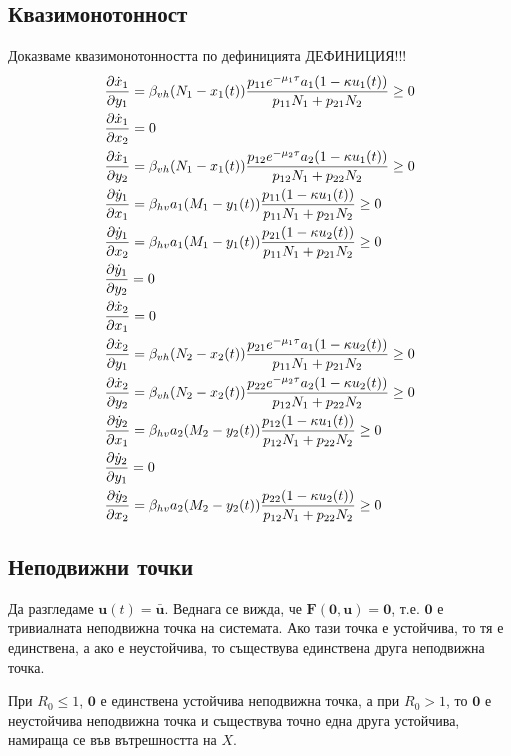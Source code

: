 \subsection{Квазимонотонност}
Доказваме квазимонотонността по дефиницията \color{Red} ДЕФИНИЦИЯ!!!
\color{Black}
\begin{align*}
  &\pdv{\dot{x}_1}{y_1} = \beta_{vh} (N_1-x_1(t)) \frac{p_{11} e^{-\mu_1 \tau} a_1 (1-\kappa u_1(t))}{p_{11} N_1 + p_{21} N_2} \geq 0 \\
  &\pdv{\dot{x}_1}{x_2} = 0 \\
  &\pdv{\dot{x}_1}{y_2} = \beta_{vh} (N_1-x_1(t))\frac{p_{12} e^{-\mu_2 \tau} a_2 (1-\kappa u_1(t))}{p_{12} N_1 + p_{22} N_2} \geq 0 \\
  &\pdv{\dot{y}_1}{x_1} = \beta_{hv} a_1 (M_1-y_1(t)) \frac{p_{11} (1-\kappa u_1(t))}{p_{11} N_1 + p_{21} N_2} \geq 0 \\
  &\pdv{\dot{y}_1}{x_2} = \beta_{hv} a_1 (M_1-y_1(t)) \frac{p_{21} (1-\kappa u_2(t))}{p_{11} N_1 + p_{21} N_2} \geq 0 \\
  &\pdv{\dot{y}_1}{y_2} = 0 \\
  &\pdv{\dot{x}_2}{x_1} = 0 \\
  &\pdv{\dot{x}_2}{y_1} = \beta_{vh} (N_2-x_2(t)) \frac{p_{21} e^{-\mu_1 \tau} a_1 (1-\kappa u_2(t))}{p_{11} N_1 + p_{21} N_2} \geq 0 \\
  &\pdv{\dot{x}_2}{y_2} = \beta_{vh} (N_2-x_2(t)) \frac{p_{22} e^{-\mu_2 \tau} a_2 (1-\kappa u_2(t))}{p_{12} N_1 + p_{22} N_2} \geq 0 \\
  &\pdv{\dot{y}_2}{x_1} = \beta_{hv} a_2 (M_2-y_2(t)) \frac{p_{12} (1-\kappa u_1(t))}{p_{12} N_1 + p_{22} N_2} \geq 0 \\
  &\pdv{\dot{y}_2}{y_1} = 0 \\
  &\pdv{\dot{y}_2}{x_2} = \beta_{hv} a_2 (M_2-y_2(t)) \frac{p_{22} (1-\kappa u_2(t))}{p_{12} N_1 + p_{22} N_2} \geq 0 \\
\end{align*}

\subsection{Неподвижни точки}
Да разгледаме $\mathbf{u}(t)=\bar{\mathbf{u}}$. Веднага се вижда, че $\mathbf{F}(\mathbf{0}, \mathbf{u}) = \mathbf{0}$, т.е. $\mathbf{0}$ е тривиалната неподвижна точка на системата. Ако тази точка е устойчива, то тя е единствена, а ако е неустойчива, то съществува единствена друга неподвижна точка.

При $R_0 \leq 1$, $\mathbf{0}$ е единствена устойчива неподвижна точка, а при $R_0 > 1$, то $\mathbf{0}$ е неустойчива неподвижна точка и съществува точно една друга устойчива, намираща се във вътрешността на $X$.


